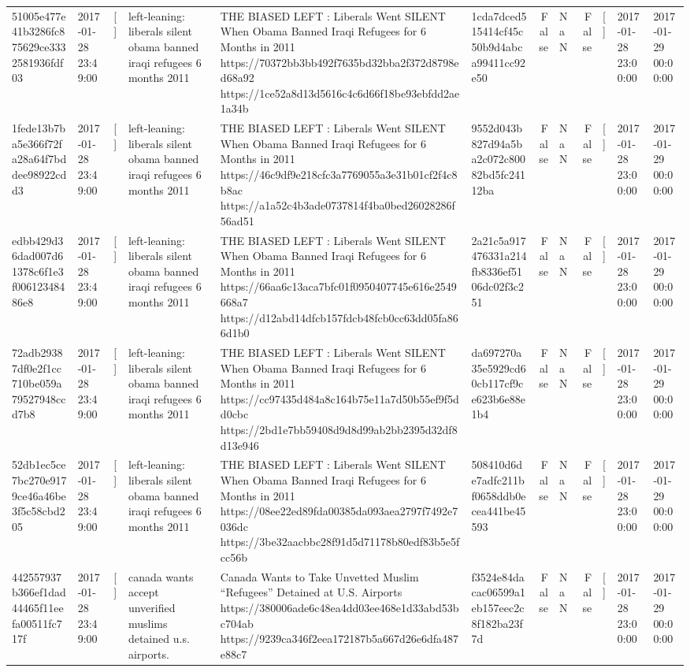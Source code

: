 \begin{tabular}{llllllrlrlll}
51005e477e41b3286fc875629ce3332581936fdf03 & 2017-01-28 23:49:00 & [] & left-leaning: liberals silent obama banned iraqi refugees 6 months 2011 & THE BIASED LEFT : Liberals Went SILENT When Obama Banned Iraqi Refugees for 6 Months in 2011 https://70372bb3bb492f7635bd32bba2f372d8798ed68a92 https://1ce52a8d13d5616c4c6d66f18be93ebfdd2ae1a34b & 1cda7dced515414cf45c50b9d4abca99411cc92e50 & False & NaN & False & [] & 2017-01-28 23:00:00 & 2017-01-29 00:00:00 \\
1fede13b7ba5e366f72fa28a64f7bddee98922cdd3 & 2017-01-28 23:49:00 & [] & left-leaning: liberals silent obama banned iraqi refugees 6 months 2011 & THE BIASED LEFT : Liberals Went SILENT When Obama Banned Iraqi Refugees for 6 Months in 2011 https://46c9df9e218cfc3a7769055a3e31b01cf2f4c8b8ac https://a1a52c4b3ade0737814f4ba0bed26028286f56ad51 & 9552d043b827d94a5ba2c072c80082bd5fc24112ba & False & NaN & False & [] & 2017-01-28 23:00:00 & 2017-01-29 00:00:00 \\
edbb429d36dad007d61378c6f1e3f00612348486e8 & 2017-01-28 23:49:00 & [] & left-leaning: liberals silent obama banned iraqi refugees 6 months 2011 & THE BIASED LEFT : Liberals Went SILENT When Obama Banned Iraqi Refugees for 6 Months in 2011 https://66aa6c13aca7bfc01f0950407745e616e2549668a7 https://d12abd14dfcb157fdcb48fcb0cc63dd05fa866d1b0 & 2a21c5a917476331a214fb8336ef5106dc02f3c251 & False & NaN & False & [] & 2017-01-28 23:00:00 & 2017-01-29 00:00:00 \\
72adb29387df0e2f1cc710be059a79527948ccd7b8 & 2017-01-28 23:49:00 & [] & left-leaning: liberals silent obama banned iraqi refugees 6 months 2011 & THE BIASED LEFT : Liberals Went SILENT When Obama Banned Iraqi Refugees for 6 Months in 2011 https://cc97435d484a8c164b75e11a7d50b55ef9f5dd0cbc https://2bd1e7bb59408d9d8d99ab2bb2395d32df8d13e946 & da697270a35e5929cd60cb117cf9ce623b6e88e1b4 & False & NaN & False & [] & 2017-01-28 23:00:00 & 2017-01-29 00:00:00 \\
52db1ec5ce7bc270e9179ce46a46be3f5c58cbd205 & 2017-01-28 23:49:00 & [] & left-leaning: liberals silent obama banned iraqi refugees 6 months 2011 & THE BIASED LEFT : Liberals Went SILENT When Obama Banned Iraqi Refugees for 6 Months in 2011 https://08ee22ed89fda00385da093aea2797f7492e7036dc https://3be32aacbbc28f91d5d71178b80edf83b5e5fcc56b & 508410d6de7adfc211bf0658ddb0ecea441be45593 & False & NaN & False & [] & 2017-01-28 23:00:00 & 2017-01-29 00:00:00 \\
442557937b366ef1dad44465f11eefa00511fc717f & 2017-01-28 23:49:00 & [] & canada wants accept unverified muslims detained u.s. airports. & Canada Wants to Take Unvetted Muslim “Refugees” Detained at U.S. Airports https://380006ade6c48ea4dd03ee468e1d33abd53bc704ab https://9239ca346f2eea172187b5a667d26e6dfa487e88c7 & f3524e84dacac06599a1eb157eec2c8f182ba23f7d & False & NaN & False & [] & 2017-01-28 23:00:00 & 2017-01-29 00:00:00 \\

\end{tabular}

